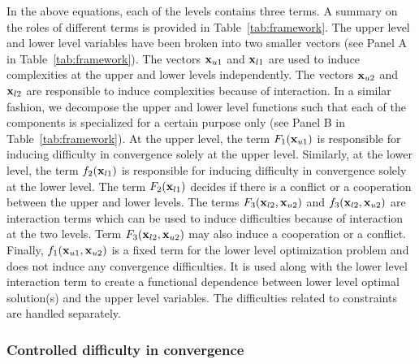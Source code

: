 \documentclass[twoside]{article}
\begin{document}
In the above equations, each of the levels contains three terms. A summary on the roles of different terms is provided in Table~\ref{tab:framework}. The upper level and lower level variables have been broken into two smaller vectors (see Panel A in Table~\ref{tab:framework}). The vectors $\mbox{$\mathbf{x}$}_{u1}$ and $\mbox{$\mathbf{x}$}_{l1}$ are used to induce complexities at the upper and lower levels independently. The vectors $\mbox{$\mathbf{x}$}_{u2}$ and $\mbox{$\mathbf{x}$}_{l2}$ are responsible to induce complexities because of interaction. In a similar fashion, we decompose the upper and lower level functions such that each of the components is specialized for a certain purpose only (see Panel B in Table~\ref{tab:framework}). At the upper level, the term $F_1(\mbox{$\mathbf{x}$}_{u1})$ is responsible for inducing difficulty in convergence solely at the upper level. Similarly, at the lower level, the term $f_2(\mbox{$\mathbf{x}$}_{l1})$ is responsible for inducing difficulty in convergence solely at the lower level. The term $F_2(\mbox{$\mathbf{x}$}_{l1})$ decides if there is a conflict or a cooperation between the upper and lower levels. The terms $F_3(\mbox{$\mathbf{x}$}_{l2}, \mbox{$\mathbf{x}$}_{u2})$ and $f_3(\mbox{$\mathbf{x}$}_{l2}, \mbox{$\mathbf{x}$}_{u2})$ are interaction terms which can be used to induce difficulties because of interaction at the two levels. Term $F_3(\mbox{$\mathbf{x}$}_{l2}, \mbox{$\mathbf{x}$}_{u2})$ may also induce a cooperation or a conflict. Finally, $f_1(\mbox{$\mathbf{x}$}_{u1}, \mbox{$\mathbf{x}$}_{u2})$ is a fixed term for the lower level optimization problem and does not induce any convergence difficulties. It is used along with the lower level interaction term to create a functional dependence between lower level optimal solution(s) and the upper level variables. The difficulties related to constraints are handled separately.

\subsubsection{Controlled difficulty in convergence}
\end{document}

